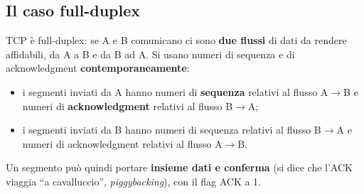 
\subsection{Il caso full-duplex}

TCP è full-duplex: se A e B comunicano ci sono \textbf{due flussi} di dati da rendere affidabili, da A a B
e da B ad A. Si usano numeri di sequenza e di acknowledgment \textbf{contemporaneamente}:

\begin{itemize}
    \item i segmenti inviati da A hanno numeri di \textbf{sequenza} relativi al flusso A$\rightarrow$B e numeri di
          \textbf{acknowledgment} relativi al flusso B$\rightarrow$A;
    \item i segmenti inviati da B hanno numeri di sequenza relativi al flusso B$\rightarrow$A e numeri di
          acknowledgment relativi al flusso A$\rightarrow$B.
\end{itemize}

Un segmento può quindi portare \textbf{insieme dati e conferma} (si dice che l'ACK viaggia ``a cavalluccio'',
\emph{piggybacking}), con il flag ACK a 1.

